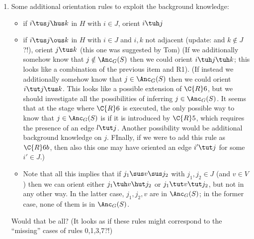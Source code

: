 {\begin{enumerate}
  \item Some additional orientation rules to exploit the background knowledge:
    \begin{itemize}
      \item if $i \tus j \hus k$ in $H$ with $i \in J$, orient $i \tuh j$
      \item if $i \tus j \ous k$ in $H$ with $i \in J$ and $i, k$ not adjacent (update: and $k \notin J$?!), orient $j \tus k$ (this one was suggested by Tom)
          (If we additionally somehow know that $j \notin \Anc_G(S)$ then we could orient $i \tuh j \tuh k$; this looks like a combination of the previous item and R1).
          (If instead we additionally somehow know that $j \in \Anc_G(S)$ then we could orient $i \tut j \tus k$. This looks like a possible extension of $\C{R}6$, but we should investigate all the possibilities of inferring $j \in \Anc_G(S)$. It seems that at the stage where $\C{R}6$ is executed, the only possible way to know that $j \in \Anc_G(S)$ is if it is introduced by $\C{R}5$, which requires the presence of an edge $l \tut j$. Another possibility would be additional background knowledge on $j$. FInally, if we were to add this rule as $\C{R}6b$, then also this one may have oriented an edge $i' \tut j$ for some $i' \in J$.)
        \item Note that all this implies that if $j_1 \sus v \sus j_2$ with $j_1,j_2 \in J$ (and $v \in V$) then 
          we can orient either $j_1 \tuh v \hut j_2$ or $j_1 \tut v \tut j_2$, but not in any other way.
          In the latter case, $j_1,j_2,v$ are in $\Anc_G(S)$; in the former case, none of them is in $\Anc_G(S)$.
    \end{itemize}
    Would that be all? (It looks as if these rules might correspond to the ``missing'' cases of rules 0,1,3,7?!)


\end{enumerate}}
